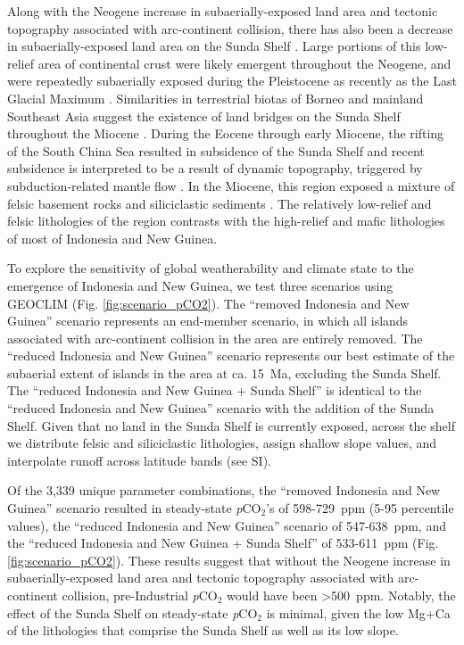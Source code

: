 \documentclass[11pt,letterpaper]{article}
\newcommand{\pCOtwo}{\textit{p}CO$_{2}$\xspace}
\begin{document}
Along with the Neogene increase in subaerially-exposed land area and tectonic topography associated with arc-continent collision, there has also been a decrease in subaerially-exposed land area on the Sunda Shelf \citep{Sarr2019a}. Large portions of this low-relief area of continental crust were likely emergent throughout the Neogene, and were repeatedly subaerially exposed during the Pleistocene as recently as the Last Glacial Maximum \citep{Hall2002a}. Similarities in terrestrial biotas of Borneo and mainland Southeast Asia suggest the existence of land bridges on the Sunda Shelf throughout the Miocene \citep{Moss1998a}. During the Eocene through early Miocene, the rifting of the South China Sea resulted in subsidence of the Sunda Shelf \citep{Morley2013a} and recent subsidence is interpreted to be a result of dynamic topography, triggered by subduction-related mantle flow \citep{Sarr2019a}. In the Miocene, this region exposed a mixture of felsic basement rocks and siliciclastic sediments \citet{Darmadi2007a}. The relatively low-relief and felsic lithologies of the region contrasts with the high-relief and mafic lithologies of most of Indonesia and New Guinea.

To explore the sensitivity of global weatherability and climate state to the emergence of Indonesia and New Guinea, we test three scenarios using GEOCLIM (Fig. \ref{fig:scenario_pCO2}). The ``removed Indonesia and New Guinea'' scenario represents an end-member scenario, in which all islands associated with arc-continent collision in the area are entirely removed. The ``reduced Indonesia and New Guinea'' scenario represents our best estimate of the subaerial extent of islands in the area at ca. 15~Ma, excluding the Sunda Shelf. The ``reduced Indonesia and New Guinea + Sunda Shelf'' is identical to the ``reduced Indonesia and New Guinea'' scenario with the addition of the Sunda Shelf. Given that no land in the Sunda Shelf is currently exposed, across the shelf we distribute felsic and siliciclastic lithologies, assign shallow slope values, and interpolate runoff across latitude bands (see SI).

Of the 3,339 unique parameter combinations, the ``removed Indonesia and New Guinea'' scenario resulted in steady-state \pCOtwo's of 598-729~ppm (5-95 percentile values), the ``reduced Indonesia and New Guinea'' scenario of 547-638~ppm, and the ``reduced Indonesia and New Guinea + Sunda Shelf'' of 533-611~ppm (Fig. \ref{fig:scenario_pCO2}). These results suggest that without the Neogene increase in subaerially-exposed land area and tectonic topography associated with arc-continent collision, pre-Industrial \pCOtwo would have been \textgreater500~ppm. Notably, the effect of the Sunda Shelf on steady-state \pCOtwo is minimal, given the low Mg+Ca of the lithologies that comprise the Sunda Shelf as well as its low slope.
\end{document}
